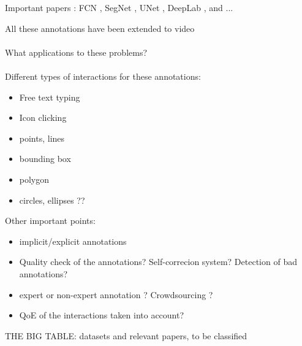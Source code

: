 Important papers : FCN \cite{long2015fully}, SegNet \cite{badrinarayanan2017segnet}, UNet \cite{ronneberger2015u}, DeepLab \cite{chen2017deeplab}, and ... 


All these annotations have been extended to video \\ \\

What applications to these problems? \\ \\


Different types of interactions for these annotations:

\begin{itemize}
	\item Free text typing
	\item Icon clicking
	\item points, lines
	\item bounding box
	\item polygon
	\item circles, ellipses ??
\end{itemize}

Other important points:

\begin{itemize}
	\item implicit/explicit annotations
	\item Quality check of the annotations? Self-correcion system? Detection of bad annotations?
	\item expert or non-expert annotation ? Crowdsourcing ?
	\item QoE of the interactions taken into account?
\end{itemize}

THE BIG TABLE: datasets and relevant papers, to be classified


